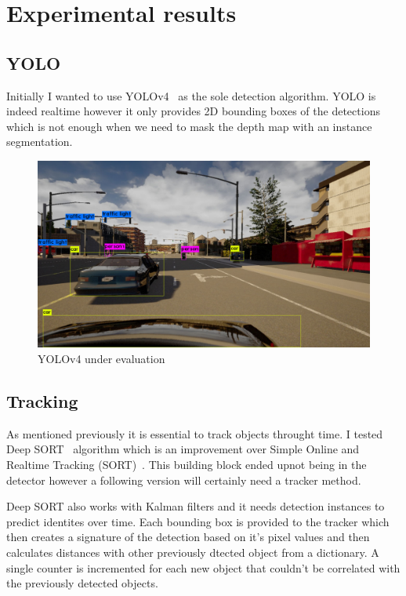 \chapter{Experimental results}
\label{chap:experimental}

\section{YOLO}

Initially I wanted to use YOLOv4~\cite{Bochkovskiy2020YOLOv4OS} as the sole
detection algorithm. YOLO is indeed realtime however it only provides 2D
bounding boxes of the detections which is not enough when we need to mask the
depth map with an instance segmentation.

\begin{figure}[!ht]
	\centering
	\includegraphics[width=150mm, keepaspectratio]{figures/yolo.jpg}
	\caption{YOLOv4 under evaluation}
	\label{fig:yolo}
\end{figure}

\section{Tracking}

As mentioned previously it is essential to track objects throught time. I tested
Deep SORT~\cite{Wojke2018deep} algorithm which is an improvement over Simple
Online and Realtime Tracking (SORT)~\cite{Wojke2017simple}. This building block
ended upnot being in the detector however a following version will certainly
need a tracker method. 

Deep SORT also works with Kalman filters and it needs detection instances to
predict identites over time. Each bounding box is provided to the tracker which
then creates a signature of the detection based on it's pixel values and then
calculates distances with other previously dtected object from a dictionary. A
single counter is incremented for each new object that couldn't be correlated
with the previously detected objects.

